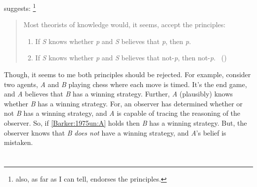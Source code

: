 \begin{note}
  \citeauthor{Barker:1975un} suggests:%
  \footnote{
    \citeauthor{Barker:1975un} also, as far as I can tell, endorses the principles.
  }

  \begin{quote}
    Most theorists of knowledge would, it seems, accept the principles:
    \begin{enumerate}[label=(\Alph*), ref=(\Alph*)]
    \item
      \label{Barker:1975un:A}
      If \emph{S} knows whether \emph{p} and \emph{S} believes that \emph{p}, then \emph{p}.
    \item
      \label{Barker:1975un:B}
      If \emph{S} knows whether \emph{p} and \emph{S} believes that not-\emph{p}, then not-\emph{p}.\newline
      \mbox{ }\hfill\mbox{(\citeyear[281]{Barker:1975un})}
    \end{enumerate}
  \end{quote}
  Though, it seems to me both principles should be rejected.
  For example, consider two agents, \emph{A} and \emph{B} playing chess where each move is timed.
  It's the end game, and \emph{A} believes that \emph{B} has a winning strategy.
  Further, \emph{A} (plausibly) knows whether \emph{B} has a winning strategy.
  For, an observer has determined whether or not \emph{B} has a winning strategy, and \emph{A} is capable of tracing the reasoning of the observer.
  So, if \ref{Barker:1975un:A} holds then \emph{B} has a winning strategy.
  But, the observer knows that \emph{B} \emph{does not} have a winning strategy, and \emph{A}'s belief is mistaken.
\end{note}

\section{}
\label{cha:fcs:sec:fcs-support}

